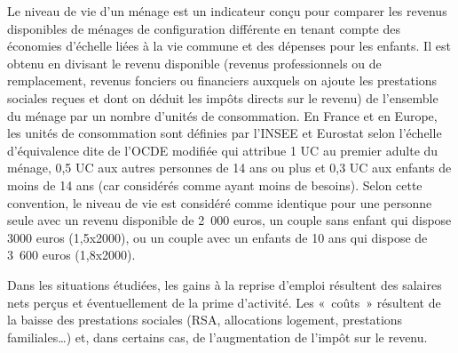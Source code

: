 \documentclass[
  french,
]{article}
\newcounter{quartocallouttipno}
\newcommand{\quartocallouttip}[1]{\refstepcounter{quartocallouttipno}\label{#1}}
\begin{document}
\begin{tcolorbox}[enhanced jigsaw, arc=.35mm, bottomrule=.15mm, bottomtitle=1mm, breakable, colback=white, colbacktitle=quarto-callout-tip-color!10!white, colframe=quarto-callout-tip-color-frame, coltitle=black, left=2mm, leftrule=.75mm, opacityback=0, opacitybacktitle=0.6, rightrule=.15mm, title={Astuce \ref*{tip-ndvdef}. Définition du niveau de vie}, titlerule=0mm, toprule=.15mm, toptitle=1mm]

\quartocallouttip{tip-ndvdef} 

Le niveau de vie d'un ménage est un indicateur conçu pour comparer les
revenus disponibles de ménages de configuration différente en tenant
compte des économies d'échelle liées à la vie commune et des dépenses
pour les enfants. Il est obtenu en divisant le revenu disponible
(revenus professionnels ou de remplacement, revenus fonciers ou
financiers auxquels on ajoute les prestations sociales reçues et dont on
déduit les impôts directs sur le revenu) de l'ensemble du ménage par un
nombre d'unités de consommation. En France et en Europe, les unités de
consommation sont définies par l'INSEE et Eurostat selon l'échelle
d'équivalence dite de l'OCDE modifiée qui attribue 1 UC au premier
adulte du ménage, 0,5 UC aux autres personnes de 14 ans ou plus et 0,3
UC aux enfants de moins de 14 ans (car considérés comme ayant moins de
besoins). Selon cette convention, le niveau de vie est considéré comme
identique pour une personne seule avec un revenu disponible de 2~000
euros, un couple sans enfant qui dispose 3000 euros (1,5x2000), ou un
couple avec un enfants de 10 ans qui dispose de 3~600 euros (1,8x2000).

\end{tcolorbox}

Dans les situations étudiées, les gains à la reprise d'emploi résultent
des salaires nets perçus et éventuellement de la prime d'activité. Les
«~coûts~» résultent de la baisse des prestations sociales (RSA,
allocations logement, prestations familiales\ldots) et, dans certains
cas, de l'augmentation de l'impôt sur le revenu.
\end{document}
